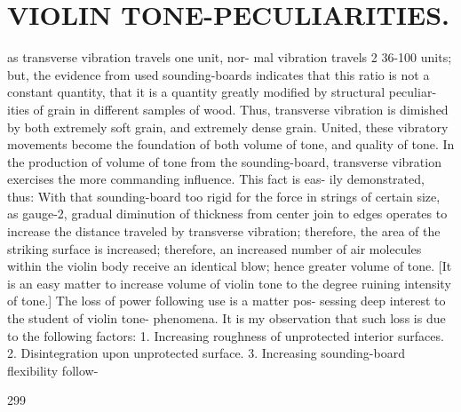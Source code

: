 \documentclass{article}
\begin{document}
\section*{VIOLIN TONE-PECULIARITIES.}
as transverse vibration travels one unit, nor- mal vibration travels 2 36-100 units; but, the evidence from used sounding-boards indicates that this ratio is not a constant quantity, that it is a quantity greatly modified by structural peculiar- ities of grain in different samples of wood. Thus, transverse vibration is dimished by both extremely soft grain, and extremely dense grain. United, these vibratory movements become the foundation of both volume of tone, and quality of tone. In the production of volume of tone from the sounding-board, transverse vibration exercises the more commanding influence. This fact is eas- ily demonstrated, thus: With that sounding-board too rigid for the force in strings of certain size, as gauge-2, gradual diminution of thickness from center join to edges operates to increase the distance traveled by transverse vibration; therefore, the area of the striking surface is increased; therefore, an increased number of air molecules within the violin body receive an identical blow; hence greater volume of tone. [It is an easy matter to increase volume of violin tone to the degree ruining intensity of tone.] The loss of power following use is a matter pos- sessing deep interest to the student of violin tone- phenomena. It is my observation that such loss is due to the following factors: 1. Increasing roughness of unprotected interior surfaces. 2. Disintegration upon unprotected surface. 3. Increasing sounding-board flexibility follow-

299
\end{document}

